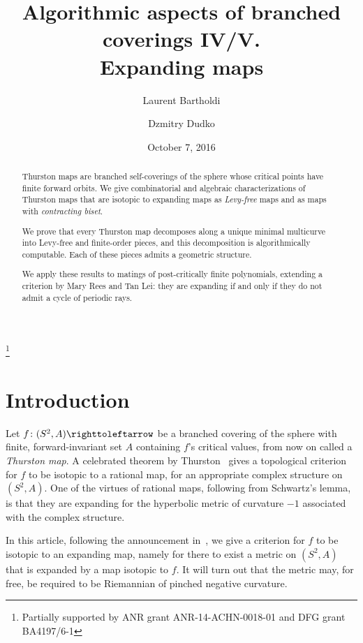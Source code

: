 \documentclass{amsart}
\begin{document}
\title[Expanding maps]{Algorithmic aspects of branched coverings IV/V.\\ Expanding maps}
\author{Laurent Bartholdi}
\author{Dzmitry Dudko}
\address{\'Ecole Normale Sup\'erieure, Paris \emph{and} Mathematisches Institut, Georg-August Universit\"at zu G\"ottingen}
\thanks{Partially supported by ANR grant ANR-14-ACHN-0018-01 and DFG grant BA4197/6-1}
\date{October 7, 2016}
\begin{abstract}
  Thurston maps are branched self-coverings of the sphere whose
  critical points have finite forward orbits. We give combinatorial
  and algebraic characterizations of Thurston maps that are isotopic
  to expanding maps as \emph{Levy-free} maps and as maps with
  \emph{contracting biset}.

  We prove that every Thurston map decomposes along a unique minimal
  multicurve into Levy-free and finite-order pieces, and this
  decomposition is algorithmically computable. Each of these pieces
  admits a geometric structure.

  We apply these results to matings of post-critically finite
  polynomials, extending a criterion by Mary Rees and Tan Lei: they
  are expanding if and only if they do not admit a cycle of periodic
  rays.
\end{abstract}
\maketitle

\section{Introduction}
Let $f\colon(S^2,A)\selfmap$ be a branched covering of the sphere with
finite, forward-invariant set $A$ containing $f$'s critical values,
from now on called a \emph{Thurston map}. A celebrated theorem by
Thurston~\cite{douady-h:thurston} gives a topological criterion for
$f$ to be isotopic to a rational map, for an appropriate complex
structure on $(S^2,A)$. One of the virtues of rational maps, following
from Schwartz's lemma, is that they are expanding for the hyperbolic
metric of curvature $-1$ associated with the complex structure.

In this article, following the announcement
in~\cite{bartholdi-dudko:bc0}, we give a criterion for $f$ to be
isotopic to an expanding map, namely for there to exist a metric on
$(S^2,A)$ that is expanded by a map isotopic to $f$. It will turn out
that the metric may, for free, be required to be Riemannian of pinched
negative curvature.
\end{document}
